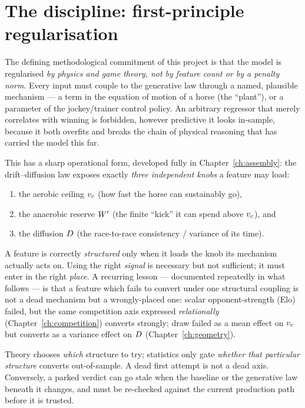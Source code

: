 \section{The discipline: first-principle regularisation}

The defining methodological commitment of this project is that the model is regularised
\emph{by physics and game theory, not by feature count or by a penalty norm}. Every input must
couple to the generative law through a named, plausible mechanism --- a term in the equation of
motion of a horse (the ``plant''), or a parameter of the jockey/trainer control policy. An
arbitrary regressor that merely correlates with winning is forbidden, however predictive it looks
in-sample, because it both overfits and breaks the chain of physical reasoning that has carried
the model this far.

This has a sharp operational form, developed fully in Chapter~\ref{ch:assembly}: the
drift--diffusion law exposes exactly \emph{three independent knobs} a feature may load:
\begin{enumerate}[label=(\roman*)]
  \item the aerobic ceiling ${v_{c}}$ (how fast the horse can sustainably go),
  \item the anaerobic reserve ${W^{\prime}}$ (the finite ``kick'' it can spend above ${v_{c}}$), and
  \item the diffusion $D$ (the race-to-race consistency / variance of its time).
\end{enumerate}
A feature is correctly \emph{structured} only when it loads the knob its mechanism actually acts
on. Using the right \emph{signal} is necessary but not sufficient; it must enter in the right
\emph{place}. A recurring lesson --- documented repeatedly in what follows --- is that a feature
which fails to convert under one structural coupling is not a dead mechanism but a wrongly-placed
one: scalar opponent-strength (Elo) failed, but the same competition axis expressed
\emph{relationally} (Chapter~\ref{ch:competition}) converts strongly; draw failed as a mean
effect on ${v_{c}}$ but converts as a variance effect on $D$ (Chapter~\ref{ch:geometry}).

\begin{principle}
Theory chooses \emph{which} structure to try; statistics only gate \emph{whether that particular
structure} converts out-of-sample. A dead first attempt is not a dead axis. Conversely, a
parked verdict can go stale when the baseline or the generative law beneath it changes, and must
be re-checked against the current production path before it is trusted.
\end{principle}

